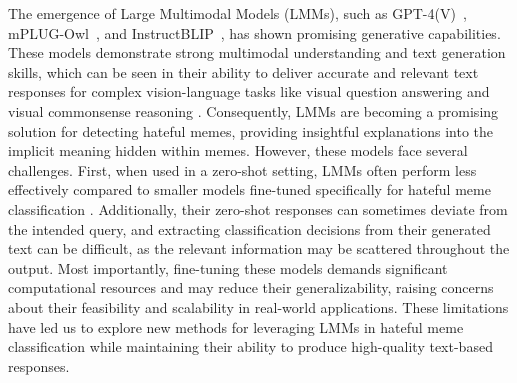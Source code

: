 The emergence of Large Multimodal Models (LMMs), such as GPT-4(V)~\cite{openai2023gpt4v}, mPLUG-Owl~\cite{ye2023mplug}, and InstructBLIP~\cite{dai2023instructblip}, has shown promising generative capabilities. These models demonstrate strong multimodal understanding and text generation skills, which can be seen in their ability to deliver accurate and relevant text responses for complex vision-language tasks like visual question answering and visual commonsense reasoning \cite{xu2023lvlm, yang2023dawn}. Consequently, LMMs are becoming a promising solution for detecting hateful memes, providing insightful explanations into the implicit meaning hidden within memes. However, these models face several challenges. First, when used in a zero-shot setting, LMMs often perform less effectively compared to smaller models fine-tuned specifically for hateful meme classification \cite{lin2024goat}. Additionally, their zero-shot responses can sometimes deviate from the intended query, and extracting classification decisions from their generated text can be difficult, as the relevant information may be scattered throughout the output. Most importantly, fine-tuning these models demands significant computational resources and may reduce their generalizability, raising concerns about their feasibility and scalability in real-world applications. These limitations have led us to explore new methods for leveraging LMMs in hateful meme classification while maintaining their ability to produce high-quality text-based responses.


